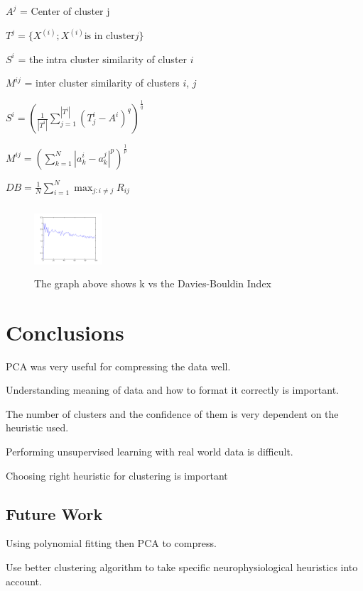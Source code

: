 \documentclass[conference]{IEEEtran}
\begin{document}
$A^j$ = Center of cluster j

$T^j = \{ {X^{(i)} ; X^{(i)} \text{is in cluster} j} \}$

$S^i$ = the intra cluster similarity of cluster $i$

$M^{ij}$ = inter cluster similarity of clusters $i$, $j$

$S^i = (\frac{1}{|T^i|} \sum\limits_{j=1}^{|T^i|} (T^i_j -A^i)^q)^{\frac{1}{q}}$

$M^{ij} = (\sum\limits_{k=1}^{N} |a^i_k - a^j_k|^p)^{\frac{1}{p}}$

$DB = \frac{1}{N} \sum\limits_{i=1}^N \max_{j:i \neq j} R_{ij}$

\begin{figure}
\centering
\includegraphics[width=1in,height=1in]{../poster/images/davies_k_vs_davies_index.png}
\caption{The graph above shows k vs the Davies-Bouldin Index}
\end{figure}


\section{Conclusions}
PCA was very useful for compressing the data well.

Understanding meaning of data and how to format it correctly is important.

The number of clusters and the confidence of them is very dependent on the
heuristic used. 

Performing unsupervised learning with real world data is difficult.

Choosing right heuristic for clustering is important

\subsection{Future Work}
Using polynomial fitting then PCA to compress.

Use better clustering algorithm to take specific
            neurophysiological heuristics into account.



%

%
%
\end{document}

